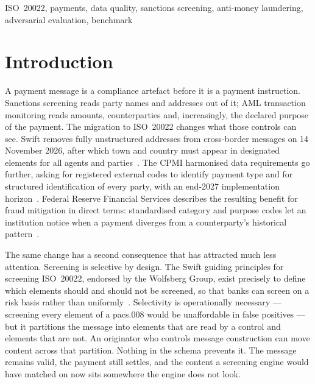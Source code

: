 \documentclass[conference]{IEEEtran}
\begin{document}
\begin{IEEEkeywords}
ISO~20022, payments, data quality, sanctions screening, anti-money
laundering, adversarial evaluation, benchmark
\end{IEEEkeywords}

\section{Introduction}

A payment message is a compliance artefact before it is a payment
instruction. Sanctions screening reads party names and addresses out of it;
AML transaction monitoring reads amounts, counterparties and, increasingly,
the declared purpose of the payment. The migration to ISO~20022 changes what
those controls can see. Swift removes fully unstructured addresses from
cross-border messages on 14 November 2026, after which town and country must
appear in designated elements for all agents and parties~\cite{swift2026addr}.
The CPMI harmonised data requirements go further, asking for registered
external codes to identify payment type and for structured identification of
every party, with an end-2027 implementation
horizon~\cite{cpmi2026}. Federal Reserve Financial Services describes the
resulting benefit for fraud mitigation in direct terms: standardised category
and purpose codes let an institution notice when a payment diverges from a
counterparty's historical pattern~\cite{frb2026}.

The same change has a second consequence that has attracted much less
attention. Screening is selective by design. The Swift guiding principles for
screening ISO~20022, endorsed by the Wolfsberg Group, exist precisely to
define which elements should and should not be screened, so that banks can
screen on a risk basis rather than uniformly~\cite{swiftgp2021,wolfsberg2023}.
Selectivity is operationally necessary --- screening every element of a
pacs.008 would be unaffordable in false positives --- but it partitions the
message into elements that are read by a control and elements that are not.
An originator who controls message construction can move content across that
partition. Nothing in the schema prevents it. The message remains valid, the
payment still settles, and the content a screening engine would have matched
on now sits somewhere the engine does not look.
\end{document}
